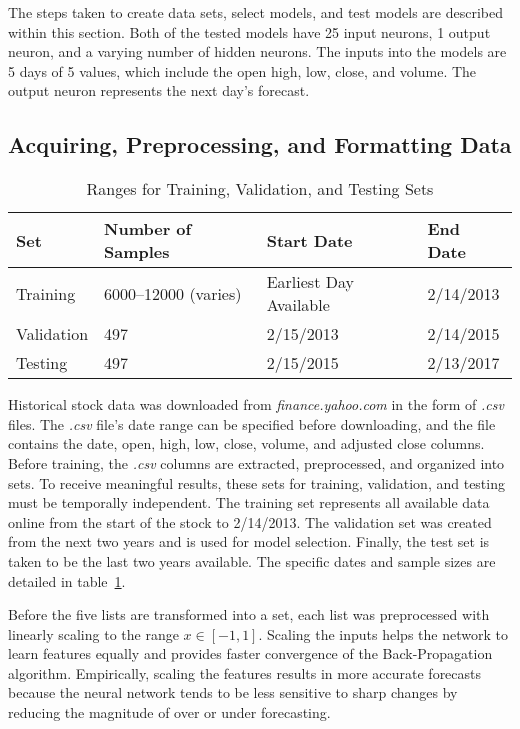 The steps taken to create data sets, select models, and test models are described within this section.
Both of the tested models have 25 input neurons, 1 output neuron, and a varying number of hidden neurons.
The inputs into the models are 5 days of 5 values, which include the open high, low, close, and volume.
The output neuron represents the next day's forecast.

\subsection{Acquiring, Preprocessing, and Formatting Data}\label{subsec:acquiring-preprocessing-and-formatting-data}

\begin{table}[!htbp]
\caption{Ranges for Training, Validation, and Testing Sets}
\label{tab:samples_dates}
	\begin{tabular}{llll}\toprule
	Set        & Number of Samples     & Start Date             & End Date  \\\midrule
	Training   & 6000--12000 (varies)  & Earliest Day Available & 2/14/2013 \\
	Validation & 497                   & 2/15/2013              & 2/14/2015 \\
	Testing    & 497                   & 2/15/2015              & 2/13/2017 \\\bottomrule
	\end{tabular}
\end{table}

Historical stock data was downloaded from \textit{finance.yahoo.com} in the form of \textit{.csv} files.
The \textit{.csv} file's date range can be specified before downloading, and the file contains the date, open, high, low, close, volume, and adjusted close columns.
Before training, the \textit{.csv} columns are extracted, preprocessed, and organized into sets.
To receive meaningful results, these sets for training, validation, and testing must be temporally independent.
The training set represents all available data online from the start of the stock to 2/14/2013.
The validation set was created from the next two years and is used for model selection.
Finally, the test set is taken to be the last two years available.
The specific dates and sample sizes are detailed in table~\ref{tab:samples_dates}.

Before the five lists are transformed into a set, each list was preprocessed with linearly scaling to the range $x \in [-1,1]$.
Scaling the inputs helps the network to learn features equally and provides faster convergence of the Back-Propagation algorithm.
Empirically, scaling the features results in more accurate forecasts because the neural network tends to be less sensitive to sharp changes by reducing the magnitude of over or under forecasting.

